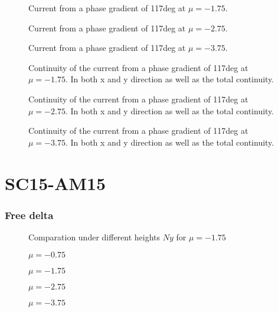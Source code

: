 \documentclass[../main.tex]{subfiles}
\begin{document}
\begin{figure}[H]
    
    \caption{Current from a phase gradient of 117deg at $\mu = -1.75$.}
\end{figure}
\begin{figure}[H]
    
    \caption{Current from a phase gradient of 117deg at $\mu = -2.75$.}
\end{figure}
\begin{figure}[H]
    
    \caption{Current from a phase gradient of 117deg at $\mu = -3.75$.}
\end{figure}
\begin{figure}[H]
    
    \caption{Continuity of the current from a phase gradient of 117deg at $\mu = -1.75$. In both x and y direction as
    well as the total continuity.}
\end{figure}
\begin{figure}[H]
    
    \caption{Continuity of the current from a phase gradient of 117deg at $\mu = -2.75$. In both x and y direction as
    well as the total continuity.}
\end{figure}
\begin{figure}[H]
    
    \caption{Continuity of the current from a phase gradient of 117deg at $\mu = -3.75$. In both x and y direction as
    well as the total continuity.}
\end{figure}

\section{SC15-AM15}
\subsubsection{Free delta}
\begin{figure}[H]
    
    \caption{Comparation under different heights $Ny$ for $\mu = -1.75$}
\end{figure}
\begin{figure}[H]
    
    \caption{$\mu = -0.75$}
\end{figure}
\begin{figure}[H]
    
    \caption{$\mu = -1.75$}
\end{figure}
\begin{figure}[H]
    
    \caption{$\mu = -2.75$}
\end{figure}
\begin{figure}[H]
    
    \caption{$\mu = -3.75$}
\end{figure}
\end{document}
